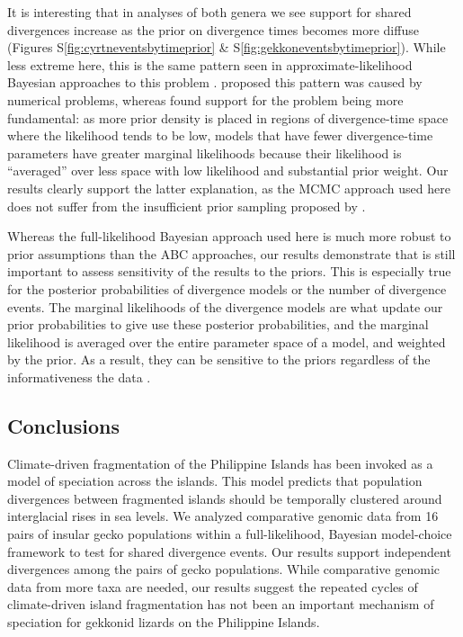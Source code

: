 It is interesting that in analyses of both genera we see support for shared
divergences increase as the prior on divergence times becomes more diffuse
(Figures
S\ref{fig:cyrtneventsbytimeprior}
\&
S\ref{fig:gekkoneventsbytimeprior}).
While less extreme here, this is the same pattern seen in
approximate-likelihood Bayesian approaches to this problem
\citep{Oaks2012,Hickerson2013,Oaks2014reply}.
\citet{Hickerson2013} proposed this pattern was caused by numerical problems,
whereas \citet{Oaks2014reply} found support for the problem being more
fundamental:
as more prior density is placed in regions of divergence-time space where the
likelihood tends to be low, models that have fewer divergence-time parameters
have greater marginal likelihoods because their likelihood is ``averaged''
over less space with low likelihood and substantial prior weight.
Our results clearly support the latter explanation, as the MCMC approach used
here does not suffer from the insufficient prior sampling proposed by
\citet{Hickerson2013}.

Whereas the full-likelihood Bayesian approach used here is much more robust to
prior assumptions than the ABC approaches, our results demonstrate that is
still important to assess sensitivity of the results to the priors.
This is especially true for the posterior probabilities of divergence models or
the number of divergence events.
The marginal likelihoods of the divergence models are what update our prior
probabilities to give use these posterior probabilities, and the marginal
likelihood is averaged over the entire parameter space of a model, and weighted
by the prior.
As a result, they can be sensitive to the priors regardless of the
informativeness the data \citep{Oaks2018marginal}.

\subsection{Conclusions}
Climate-driven fragmentation of the Philippine Islands has been invoked as
a model of speciation across the islands.
This model predicts that population divergences between fragmented islands
should be temporally clustered around interglacial rises in sea levels.
We analyzed comparative genomic data from 16 pairs of insular gecko populations
within a full-likelihood, Bayesian model-choice framework to test for shared
divergence events.
Our results support independent divergences among the pairs of gecko
populations.
While comparative genomic data from more taxa are needed, our results suggest
the repeated cycles of climate-driven island fragmentation has not been an
important mechanism of speciation for gekkonid lizards on the Philippine
Islands.
